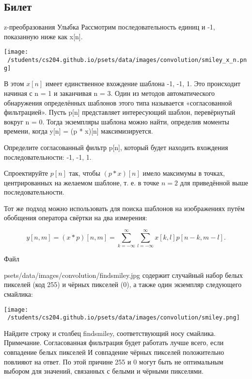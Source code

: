 \documentclass{exam}
\begin{document}
\newpage
\begin{questions}
\section{Билет}
	\question 
z-преобразования 
	\question 
Улыбка
Рассмотрим последовательность единиц и -1, показанную ниже как x[n].
 
\texttt{[image: ~/students/cs204.github.io/psets/data/images/convolution/smiley\_x\_n.png]}

	В этом \(x[n]\) имеет единственное вхождение шаблона -1, -1, 1.
Это происходит начиная с n = 1 и заканчивая n = 3.
Один из методов автоматического обнаружения определённых шаблонов 
этого типа называется «согласованной фильтрацией».
Пусть p[n] представляет интересующий шаблон, перевёрнутый вокруг n = 0.
Тогда экземпляры шаблона можно найти, определив моменты 
времени, когда y[n] = (p * x)[n] максимизируется.

Определите согласованный фильтр p[n], который будет 
находить вхождения последовательности: -1, -1, 1.

Спроектируйте \(p[n]\) так, чтобы \((p*x)[n]\) имело максимумы в 
	точках, центрированных на желаемом шаблоне, т. е. в точке \( n = 2\) 
для приведённой выше последовательности.

Тот же подход можно использовать для поиска шаблонов на изображениях 
путём обобщения оператора свёртки на два измерения:


	\[
y[n,m]=(x*p)[n,m]=\sum_{k=-\infty}^\infty \sum_{l=-\infty}^\infty x[k,l]p[n-k, m-l].
\]

Файл 

	psets/data/images/convolution/findsmiley.jpg
содержит случайный набор белых пикселей (код 255) и чёрных пикселей (0), 
а также один экземпляр следующего смайлика:

\texttt{[image: ~/students/cs204.github.io/psets/data/images/convolution/smiley.png]} 

Найдите строку и столбец findsmiley, соответствующий носу смайлика.
Примечание. Согласованная фильтрация будет работать лучше всего, 
если совпадение белых пикселей И совпадение чёрных пикселей 
положительно повлияют на ответ.
По этой причине 255 и 0 могут быть не оптимальным выбором для значений, 
связанных с белыми и чёрными пикселями.

\end{questions}
\vspace{15pt}
\end{document}
